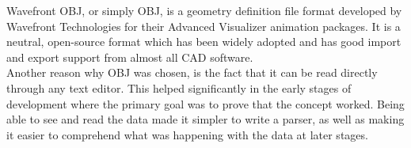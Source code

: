 Wavefront OBJ, or simply OBJ, is a geometry definition file format developed by Wavefront Technologies for their Advanced Visualizer animation packages\cite{bib:OBJ}. It is a neutral, open-source format which has been widely adopted and has good import and export support from almost all \acs{CAD} software.\\
Another reason why OBJ was chosen, is the fact that it can be read directly through any text editor. This helped significantly in the early stages of development where the primary goal was to prove that the concept worked. Being able to see and read the data made it simpler to write a parser, as well as making it easier to comprehend what was happening with the data at later stages.\\
\begin{table}[htbp]
	\centering 
	\caption[ObjTypes]{Relevant types in OBJ format}
	\label{tab:ObjTypes}
\end{table}

